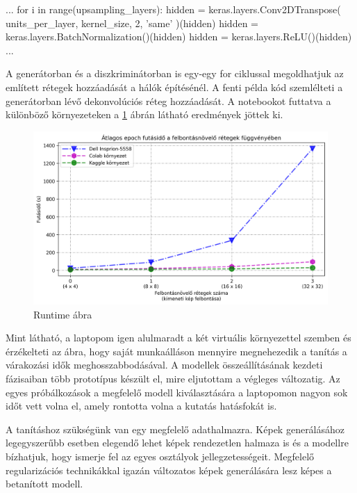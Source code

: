 \begin{python}
...
for i in range(upsampling_layers):
    hidden = keras.layers.Conv2DTranspose(
        units_per_layer, kernel_size, 2, 'same'
    )(hidden)
    hidden = keras.layers.BatchNormalization()(hidden)
    hidden = keras.layers.ReLU()(hidden)
...
\end{python}

A generátorban és a diszkriminátorban is egy-egy for ciklussal megoldhatjuk az említett rétegek hozzáadását a hálók építésénél. A fenti példa kód szemlélteti a generátorban lévő dekonvolúciós réteg hozzáadását.
A notebookot futtatva a különböző környezeteken a \ref{fig:runtime} ábrán látható eredmények jöttek ki.

\begin{figure}[h]
\centering
\includegraphics[width=15cm]{images/runtime.png}
\caption{Runtime ábra}
\label{fig:runtime}
\end{figure}

Mint látható, a laptopom igen alulmaradt a két virtuális környezettel szemben és érzékelteti az ábra, hogy saját munkaálláson mennyire megnehezedik a tanítás a várakozási idők meghosszabbodásával. A modellek összeállításának kezdeti fázisaiban több prototípus készült el, mire eljutottam a végleges változatig. Az egyes próbálkozások a megfelelő modell kiválasztására a laptopomon nagyon sok időt vett volna el, amely rontotta volna a kutatás hatásfokát is.

\newpage


A tanításhoz szükségünk van egy megfelelő adathalmazra. Képek generálásához legegyszerűbb esetben elegendő lehet képek rendezetlen halmaza is és a modellre bízhatjuk, hogy ismerje fel az egyes osztályok jellegzetességeit. Megfelelő regularizációs technikákkal igazán változatos képek generálására lesz képes a betanított modell.

